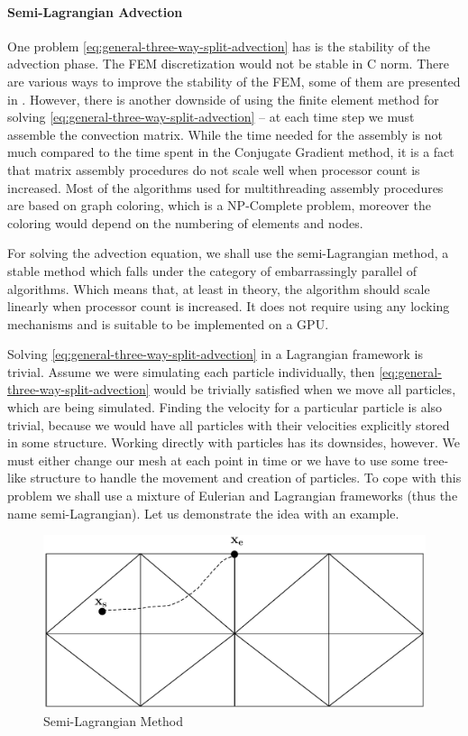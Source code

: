 \paragraph{Semi-Lagrangian Advection}
One problem \cref{eq:general-three-way-split-advection} has is the stability of the advection phase. The FEM discretization would not be stable in C norm. There are various ways to improve the stability of the FEM, some of them are presented in \cite{gresho-fem}. However, there is another downside of using the finite element method for solving \cref{eq:general-three-way-split-advection} -- at each time step we must assemble the convection matrix. While the time needed for the assembly is not much compared to the time spent in the Conjugate Gradient method, it is a fact that matrix assembly procedures do not scale well when processor count is increased. Most of the algorithms used for multithreading assembly procedures are based on graph coloring, which is a NP-Complete problem, moreover the coloring would depend on the numbering of elements and nodes.

For solving the advection equation, we shall use the semi-Lagrangian method, a stable method \cite{semi-lagrangian-stability} which falls under the category of embarrassingly parallel of algorithms. Which means that, at least in theory, the algorithm should scale linearly when processor count is increased. It does not require using any locking mechanisms and is suitable to be implemented on a GPU.

Solving \cref{eq:general-three-way-split-advection} in a Lagrangian framework is trivial. Assume we were simulating each particle individually, then \cref{eq:general-three-way-split-advection} would be trivially satisfied when we move all particles, which are being simulated. Finding the velocity for a particular particle is also trivial, because we would have all particles with their velocities explicitly stored in some structure. Working directly with particles has its downsides, however. We must either change our mesh at each point in time or we have to use some tree-like structure to handle the movement and creation of particles. To cope with this problem we shall use a mixture of Eulerian and Lagrangian frameworks (thus the name semi-Lagrangian). Let us demonstrate the idea with an example.

\begin{figure}[H]
	\includegraphics[width=\linewidth]{Figures/semi-lagrangian.pdf}
	\caption{Semi-Lagrangian Method}
	\label{fig:semi-lagrangian}
\end{figure}

